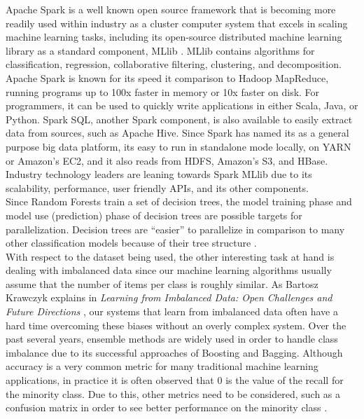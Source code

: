 \documentclass{neu_handout}
\begin{document}
Apache Spark is a well known open source framework that is becoming more readily used within industry as a cluster computer system that excels in scaling machine learning tasks, including its open-source distributed machine learning library as a standard component, MLlib \cite{mllib}. MLlib contains algorithms for classification, regression, collaborative filtering, clustering, and decomposition. Apache Spark is known for its speed it comparison to Hadoop MapReduce, running programs up to 100x faster in memory or 10x faster on disk. For programmers, it can be used to quickly write applications in either Scala, Java, or Python. Spark SQL, another Spark component, is also available to easily extract data from sources, such as Apache Hive. Since Spark has named its as a general purpose big data platform, its easy to run in standalone mode locally, on YARN or Amazon's EC2, and it also reads from HDFS, Amazon's S3, and HBase. Industry technology leaders are leaning towards Spark MLlib due to its scalability, performance, user friendly APIs, and its other components.\\

Since Random Forests train a set of decision trees, the model training phase and model use (prediction) phase of decision trees are possible targets for parallelization. Decision trees are ``easier'' to parallelize in comparison to many other classification models because of their tree structure \cite{parallelrf}.\\

With respect to the dataset being used, the other interesting task at hand is dealing with imbalanced data since our machine learning algorithms usually assume that the number of items per class is roughly similar. As Bartosz Krawczyk explains in \textit{Learning from Imbalanced Data: Open Challenges and Future Directions} \cite{Krawczyk}, our systems that learn from imbalanced data often have a hard time overcoming these biases without an overly complex system. Over the past several years, ensemble methods are widely used in order to handle class imbalance due to its successful approaches of Boosting and Bagging. Although accuracy is a very common metric for many traditional machine learning applications, in practice it is often observed that 0 is the value of the recall for the minority class. Due to this, other metrics need to be considered, such as a confusion matrix in order to see better performance on the minority class \cite{imbalance}.
\end{document}
